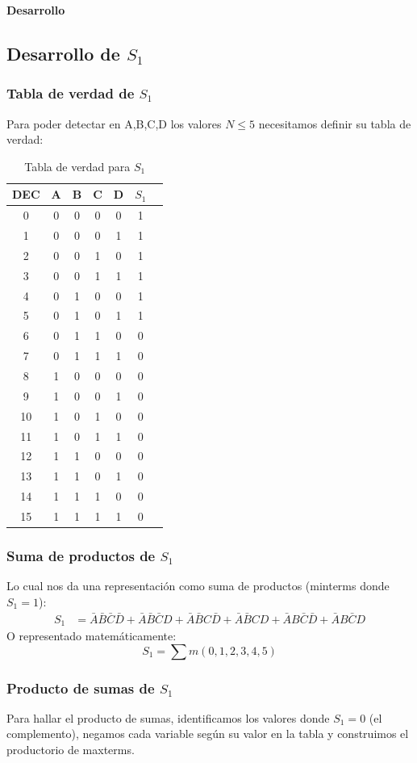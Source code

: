 \documentclass[11pt,a4paper]{article}
\newcommand{\tverdad}[4]{%
  \begin{table}[H]%
  \centering%
  \begin{tabular}{|*{#1}{c|}|*{#2}{c|}}%
    #3%
  \end{tabular}%
  \caption{#4}%
  \end{table}%
}
\begin{document}
\textbf{Desarrollo}

\subsection*{Desarrollo de $S_1$}
\subsubsection*{Tabla de verdad de $S_1$}
Para poder detectar en A,B,C,D los valores $N \leq 5$ necesitamos definir su tabla de verdad:
\tverdad{6}{1}{%
  \hline
  DEC & A & B & C & D & $S_1$ \\
  \hline
  0  & 0 & 0 & 0 & 0 & 1 \\
  1  & 0 & 0 & 0 & 1 & 1 \\
  2  & 0 & 0 & 1 & 0 & 1 \\
  3  & 0 & 0 & 1 & 1 & 1 \\
  4  & 0 & 1 & 0 & 0 & 1 \\
  5  & 0 & 1 & 0 & 1 & 1 \\
  6  & 0 & 1 & 1 & 0 & 0 \\
  7  & 0 & 1 & 1 & 1 & 0 \\
  8  & 1 & 0 & 0 & 0 & 0 \\
  9  & 1 & 0 & 0 & 1 & 0 \\
  10 & 1 & 0 & 1 & 0 & 0 \\
  11 & 1 & 0 & 1 & 1 & 0 \\
  12 & 1 & 1 & 0 & 0 & 0 \\
  13 & 1 & 1 & 0 & 1 & 0 \\
  14 & 1 & 1 & 1 & 0 & 0 \\
  15 & 1 & 1 & 1 & 1 & 0 \\
  \hline%
}{Tabla de verdad para $S_1$}

\subsubsection*{Suma de productos de $S_1$}
Lo cual nos da una representación como suma de productos (minterms donde $S_1 = 1$):
\begin{align}
S_1 &= \bar{A}\bar{B}\bar{C}\bar{D} + \bar{A}\bar{B}\bar{C}D + \bar{A}\bar{B}C\bar{D} + \bar{A}\bar{B}CD + \bar{A}B\bar{C}\bar{D} + \bar{A}B\bar{C}D
\end{align}
O representado matemáticamente:
\[S_1 = \sum m(0,1,2,3,4,5)\]

\subsubsection*{Producto de sumas de $S_1$}
Para hallar el producto de sumas, identificamos los valores donde $S_1 = 0$ (el complemento), negamos cada variable según su valor en la tabla y construimos el productorio de maxterms.
\end{document}
